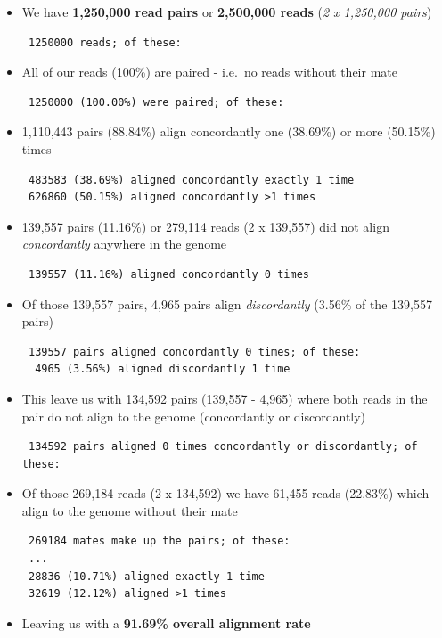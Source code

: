 \documentclass[11pt]{article}
\begin{document}
\begin{itemize}
\item
  We have \textbf{1,250,000 read pairs} or \textbf{2,500,000 reads}
  (\textit{2 x 1,250,000 pairs})

\begin{verbatim}
 1250000 reads; of these:
\end{verbatim}
\item
  All of our reads (100\%) are paired - i.e.~no reads without their mate

\begin{verbatim}
 1250000 (100.00%) were paired; of these:

\end{verbatim}
\item
  1,110,443 pairs (88.84\%) align concordantly one (38.69\%) or more
  (50.15\%) times

\begin{verbatim}
 483583 (38.69%) aligned concordantly exactly 1 time
 626860 (50.15%) aligned concordantly >1 times
\end{verbatim}
\item
  139,557 pairs (11.16\%) or 279,114 reads (2 x 139,557) did not align
  \textit{concordantly} anywhere in the genome

\begin{verbatim}
 139557 (11.16%) aligned concordantly 0 times
\end{verbatim}
\item
  Of those 139,557 pairs, 4,965 pairs align \textit{discordantly} (3.56\%
  of the 139,557 pairs)

\begin{verbatim}
 139557 pairs aligned concordantly 0 times; of these:
  4965 (3.56%) aligned discordantly 1 time
\end{verbatim}
\item
  This leave us with 134,592 pairs (139,557 - 4,965) where both reads in
  the pair do not align to the genome (concordantly or discordantly)

\begin{verbatim}
 134592 pairs aligned 0 times concordantly or discordantly; of these:
\end{verbatim}
\item
  Of those 269,184 reads (2 x 134,592) we have 61,455 reads (22.83\%)
  which align to the genome without their mate

\begin{verbatim}
 269184 mates make up the pairs; of these:
 ...
 28836 (10.71%) aligned exactly 1 time
 32619 (12.12%) aligned >1 times
\end{verbatim}
\item
  Leaving us with a \textbf{91.69\% overall alignment rate}
\end{itemize}
\end{document}
